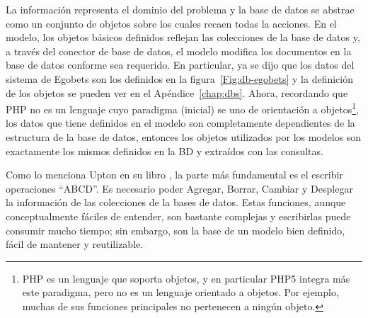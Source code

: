 		La información representa el dominio del problema y la base de datos se abstrae como un conjunto de objetos sobre los cuales recaen todas la acciones. En el modelo, los objetos básicos definidos reflejan las colecciones de la base de datos y, a través del conector de base de datos, el modelo modifica los documentos en la base de datos conforme sea requerido.
		En particular, ya se dijo que los datos del sistema de Egobets son los definidos en la figura~\ref{Fig:db-egobets} y la definición de los objetos se pueden ver en el Apéndice~\ref{chap:dbs}. Ahora, recordando que PHP no es un lenguaje cuyo paradigma (inicial) se uno de orientación a objetos\footnote{PHP es un lenguaje que soporta objetos, y en particular PHP5 integra más este paradigma, pero no es un lenguaje orientado a objetos. Por ejemplo, muchas de sus funciones principales no pertenecen a ningún objeto.}, los datos que tiene definidos en el modelo son completamente dependientes de la estructura de la base de datos, entonces los objetos utilizados por los modelos son exactamente los mismos definidos en la BD y extraídos con las consultas.

		Como lo menciona Upton en su libro \cite{upton2007codeigniter}, la parte más fundamental es el escribir operaciones ``ABCD''. Es necesario poder Agregar, Borrar, Cambiar y Desplegar la información de las colecciones de la bases de datos. Estas funciones, aunque conceptualmente fáciles de entender, son bastante complejas y escribirlas puede consumir mucho tiempo; sin embargo, son la base de un modelo bien definido, fácil de mantener y reutilizable.

